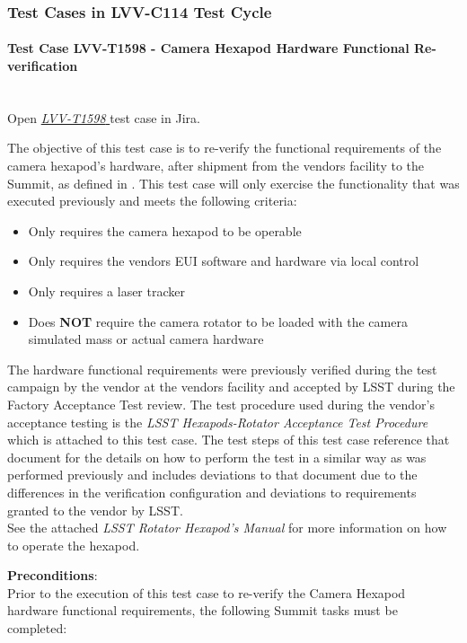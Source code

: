 \documentclass[SE,lsstdraft,STR,toc]{lsstdoc}
\providecommand{\tightlist}{
  \setlength{\itemsep}{0pt}\setlength{\parskip}{0pt}}
\begin{document}
\subsubsection{Test Cases in LVV-C114 Test Cycle}

\paragraph{Test Case LVV-T1598 - Camera Hexapod Hardware Functional Re-verification }\mbox{}\\

Open  \href{https://jira.lsstcorp.org/secure/Tests.jspa#/testCase/LVV-T1598}{\textit{ LVV-T1598 } }
test case in Jira.

The objective of this test case is to re-verify the functional
requirements of the camera hexapod's hardware, after shipment from the
vendors facility to the Summit, as defined in . This test case
will only exercise the functionality that was executed previously and
meets the following criteria:

\begin{itemize}
\tightlist
\item
  Only requires the camera hexapod to be operable
\item
  Only requires the vendors EUI software and hardware via local control
\item
  Only requires a laser tracker
\item
  Does \textbf{NOT} require the camera rotator to be loaded with the
  camera simulated mass or actual camera hardware
\end{itemize}

The hardware functional requirements were previously verified during the
test campaign by the vendor at the vendors facility and accepted by LSST
during the Factory Acceptance Test review. The test procedure used
during the vendor's acceptance testing is the \emph{LSST
Hexapods-Rotator Acceptance Test Procedure} which is attached to this
test case. The test steps of this test case reference that document for
the details on how to perform the test in a similar way as was performed
previously and includes deviations to that document due to the
differences in the verification configuration and deviations to
requirements granted to the vendor by LSST.\\[2\baselineskip]See the
attached \emph{LSST Rotator Hexapod's Manual} for more information on
how to operate the hexapod.

\textbf{ Preconditions}:\\
Prior to the execution of this test case to re-verify the Camera Hexapod
hardware functional requirements, the following Summit tasks must be
completed:
\end{document}
